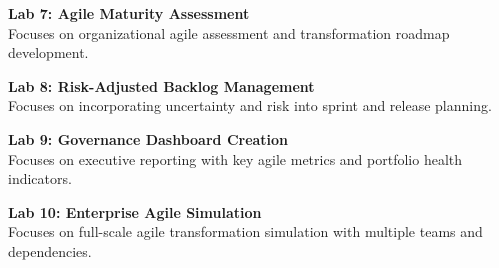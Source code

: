 \vspace{0.2cm}

\noindent\textbf{Lab 7: Agile Maturity Assessment} \\
Focuses on organizational agile assessment and transformation roadmap development.

\vspace{0.2cm}

\noindent\textbf{Lab 8: Risk-Adjusted Backlog Management} \\
Focuses on incorporating uncertainty and risk into sprint and release planning.

\vspace{0.2cm}

\noindent\textbf{Lab 9: Governance Dashboard Creation} \\
Focuses on executive reporting with key agile metrics and portfolio health indicators.

\vspace{0.2cm}

\noindent\textbf{Lab 10: Enterprise Agile Simulation} \\
Focuses on full-scale agile transformation simulation with multiple teams and dependencies.

\vspace{0.2cm}

\newpage
{}
